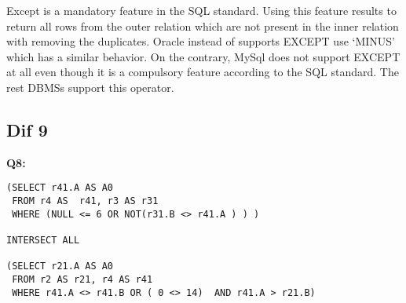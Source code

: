 Except is a mandatory feature in the  SQL standard. Using this feature results to return all rows from the outer relation which are not present in the inner relation with removing the duplicates.  Oracle instead of supports EXCEPT use ‘MINUS’ which has a similar behavior. On the contrary, MySql does not support EXCEPT at all even though it is a compulsory feature according to the SQL standard. The rest DBMSs support this operator. 

\subsection{Dif 9}
  
\begin{mdframed}[backgroundcolor=gray!20] 
\textbf{Q8:}
\begin{lstlisting}
(SELECT r41.A AS A0
 FROM r4 AS  r41, r3 AS r31
 WHERE (NULL <= 6 OR NOT(r31.B <> r41.A ) ) )
 
INTERSECT ALL

(SELECT r21.A AS A0
 FROM r2 AS r21, r4 AS r41
 WHERE r41.A <> r41.B OR ( 0 <> 14)  AND r41.A > r21.B)
\end{lstlisting}
\end{mdframed}

